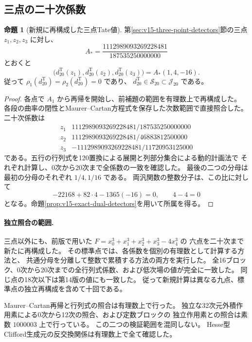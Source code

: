 \documentclass[a4paper,11pt]{ltjsarticle}
\theoremstyle{definition}
\newtheorem{proposition}[theorem]{命題}
\begin{document}
\subsection{三点の二十次係数}

\begin{proposition}[新規に再構成した三点Tate値]
\label{prop:v15-fresh-tate-twentieth}
第\ref{sec:v15-three-point-detectors}節の三点 $z_1,z_2,z_3$ に対し、
\[
 A_*=\frac{1112989093269228481}{187535250000000}
\]
とおくと
\[
 \boxed{\bigl(d_{20}^{\mathrm T}(z_1),d_{20}^{\mathrm T}(z_2),
                       d_{20}^{\mathrm T}(z_3)\bigr)
          =A_*(1,4,-16).}
\]
従って $\rho_1(d_{20}^{\mathrm T})=\rho_2(d_{20}^{\mathrm T})=0$ であり、
$d_{20}^{\mathrm T}\in\mathcal S_{20}\subset\mathcal J_{20}$ である。
\end{proposition}

\begin{proof}
各点で $A_1$ から再帰を開始し、前補題の範囲を有理数上で再構成した。
各段の曲率の閉性とMaurer--Cartan方程式を保存した次数範囲で直接照合した。
二十次係数は
\[
\begin{array}{c|c}
 z_1&1112989093269228481/187535250000000\\
 z_2&1112989093269228481/46883812500000\\
 z_3&-1112989093269228481/11720953125000
\end{array}
\]
である。五行の行列式を120置換による展開と列部分集合による動的計画法で
それぞれ計算し、0次から20次まで全係数の一致を確認した。
最後の二つの分母は最初の分母のそれぞれ $1/4,1/16$ である。
両汎関数の整数分子は、この比に対して
\[
 -22168+82\cdot4-1365(-16)=0,\qquad4-4=0
\]
となる。命題\ref{prop:v15-exact-dual-detectors}を用いて所属を得る。
\end{proof}

\paragraph{独立照合の範囲.}
三点以外にも、前版で用いた $F=x_0^3+x_1^3+x_2^3+x_3^3-4x_4^3$ の
六点を二十次まで新たに再構成した。
その標準点では、各係数を個別の有理数として計算する方法と、
共通分母を分離して整数で累積する方法の両方を実行した。
全16ブロック、0次から20次までの全行列式係数、および低次場の値が完全に一致した。
同じ点の18次以下は第14版の値にも一致した。
従って新規計算は異なる九点、標準点の独立再構成を含めて十回である。

Maurer--Cartan再帰と行列式の照合は有理数上で行った。
独立な32次元外積作用素による0次から12次の照合、および定数ブロックの
独立作用素との照合は素数 $1000003$ 上で行っている。
この二つの検証範囲を混同しない。
Hesse型Clifford生成元の反交換関係は有理数上で全て確認した。
\end{document}
